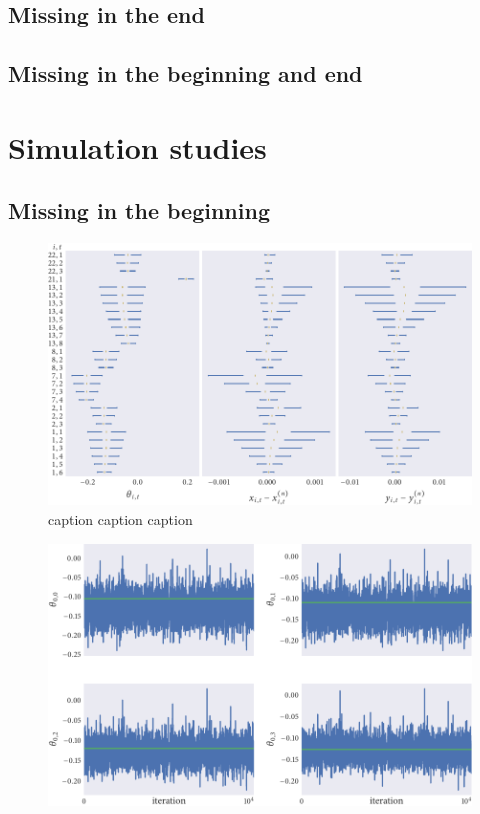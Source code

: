 \subsection{Missing in the end}

\subsection{Missing in the beginning and end}

\section{Simulation studies}

\subsection{Missing in the beginning}


\begin{figure}[tbp]
  \includegraphics{beg/summary.pdf}
  \caption{caption caption caption}
  \label{fig:beg_summary}
\end{figure}

\begin{figure}[tbp]
  \includegraphics{beg/dir_trace.pdf}
  \caption{}
  \label{fig:beg_dir_trace}
\end{figure}

